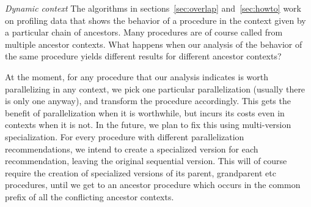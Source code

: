 


\emph{Dynamic context}
The algorithms in sections~\ref{sec:overlap} and~\ref{sec:howto}
work on profiling data that shows the behavior of a procedure
in the context given by a particular chain of ancestors.
Many procedures are of course called from multiple ancestor contexts.
What happens when our analysis of the behavior of the same procedure
yields different results for different ancestor contexts?

At the moment, for any procedure
that our analysis indicates is worth parallelizing in any context,
we pick one particular parallelization (usually there is only one anyway),
and transform the procedure accordingly.
This gets the benefit of parallelization when it is worthwhile,
but incurs its costs even in contexts when it is not.
In the future, we plan to fix this using multi-version specialization.
For every procedure with different parallelization recommendations,
we intend to create a specialized version for each recommendation,
leaving the original sequential version.
This will of course require the creation of specialized versions
of its parent, grandparent etc procedures,
until we get to an ancestor procedure
which occurs in the common prefix of all the conflicting ancestor contexts.

%
%
%

